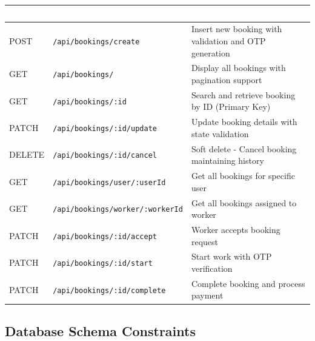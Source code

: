\documentclass[12pt,a4paper]{article}
\begin{document}
\begin{table}[H]
\centering
\renewcommand{\arraystretch}{1.8}
\begin{tabularx}{\textwidth}{|p{2cm}|p{5.5cm}|X|}
\hline
\rowcolor{headerblue}
\textcolor{white}{\textbf{Method}} & \textcolor{white}{\textbf{Endpoint}} & \textcolor{white}{\textbf{Description}} \\
\hline
\rowcolor{lightgray}
POST & \texttt{/api/bookings/create} & Insert new booking with validation and OTP generation \\
\hline
GET & \texttt{/api/bookings/} & Display all bookings with pagination support \\
\hline
\rowcolor{lightgray}
GET & \texttt{/api/bookings/:id} & Search and retrieve booking by ID (Primary Key) \\
\hline
PATCH & \texttt{/api/bookings/:id/update} & Update booking details with state validation \\
\hline
\rowcolor{lightgray}
DELETE & \texttt{/api/bookings/:id/cancel} & Soft delete - Cancel booking maintaining history \\
\hline
GET & \texttt{/api/bookings/user/:userId} & Get all bookings for specific user \\
\hline
\rowcolor{lightgray}
GET & \texttt{/api/bookings/worker/:workerId} & Get all bookings assigned to worker \\
\hline
PATCH & \texttt{/api/bookings/:id/accept} & Worker accepts booking request \\
\hline
\rowcolor{lightgray}
PATCH & \texttt{/api/bookings/:id/start} & Start work with OTP verification \\
\hline
PATCH & \texttt{/api/bookings/:id/complete} & Complete booking and process payment \\
\hline
\end{tabularx}
\end{table}

\subsection*{Database Schema Constraints}
\end{document}
